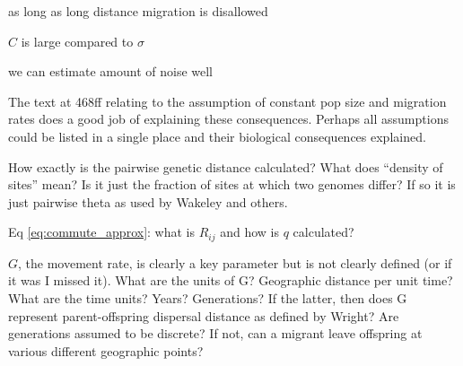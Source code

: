 \begin{point}{\revref}
     as long as long distance migration is disallowed
\end{point}


\begin{point}{\revref}
     $C$ is large compared to $\sigma$
\end{point}


\begin{point}{\revref}
     we can estimate amount of noise well
\end{point}


\begin{point}{}
    The text at 468ff relating to the assumption of constant pop size and migration
    rates does a good job of explaining these consequences.  Perhaps all
    assumptions could be listed in a single place and their biological
    consequences explained.
\end{point}


\begin{point}{\revref}
    How exactly is the pairwise genetic distance calculated?  What does ``density
    of sites'' mean?  Is it just the fraction of sites at which two genomes
    differ?  If so it is just pairwise theta as used by Wakeley and others.  
\end{point}


\begin{point}{}
    Eq \eqref{eq:commute_approx}: what is $R_{ij}$ and how is $q$ calculated?
\end{point}


\begin{point}{}
    $G$, the movement rate, is clearly a key parameter but is not clearly defined (or
    if it was I missed it).  What are the units of G?  Geographic distance per
    unit time?  What are the time units?  Years?  Generations?  If the latter,
    then does G represent parent-offspring dispersal distance as defined by
    Wright?  Are generations assumed to be discrete?  If not, can a migrant
    leave offspring at various different geographic points?
\end{point}


